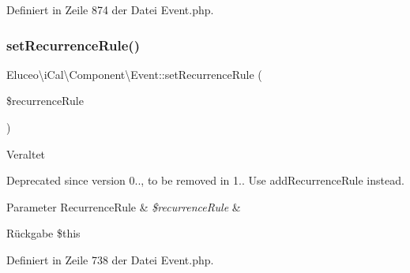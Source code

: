 Definiert in Zeile 874 der Datei Event.\+php.

\mbox{\label{class_eluceo_1_1i_cal_1_1_component_1_1_event_a8301adc5310ee5a3281f40599607c86d}} 
\subsubsection{\texorpdfstring{set\+Recurrence\+Rule()}{setRecurrenceRule()}\hspace{0.1cm}{\footnotesize\ttfamily [1/3]}}
{\footnotesize\ttfamily Eluceo\textbackslash{}i\+Cal\textbackslash{}\+Component\textbackslash{}\+Event\+::set\+Recurrence\+Rule (\begin{DoxyParamCaption}\item[{\mbox{\hyperlink{class_eluceo_1_1i_cal_1_1_property_1_1_event_1_1_recurrence_rule}{Recurrence\+Rule}}}]{\$recurrence\+Rule }\end{DoxyParamCaption})}

\begin{DoxyRefDesc}{Veraltet}
\item[\mbox{\hyperlink{deprecated__deprecated000027}{Veraltet}}]Deprecated since version 0.., to be removed in 1.. Use add\+Recurrence\+Rule instead.\end{DoxyRefDesc}



\begin{DoxyParams}[1]{Parameter}
Recurrence\+Rule & {\em \$recurrence\+Rule} & \\
\hline
\end{DoxyParams}
\begin{DoxyReturn}{Rückgabe}
\$this 
\end{DoxyReturn}


Definiert in Zeile 738 der Datei Event.\+php.

\mbox{\label{class_eluceo_1_1i_cal_1_1_component_1_1_event_a8301adc5310ee5a3281f40599607c86d}} 
